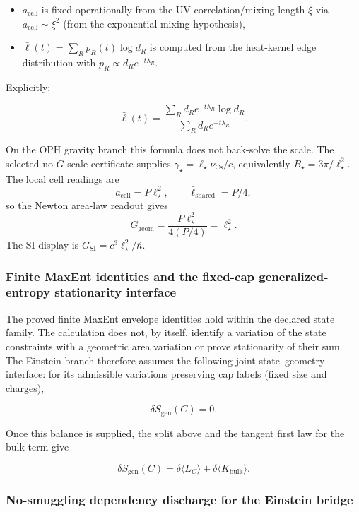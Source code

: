 \begin{itemize}
\tightlist
\item
  \(a_{\mathrm{cell}}\) is fixed operationally from the UV correlation/mixing length \(\xi\) via \(a_{\mathrm{cell}} \sim \xi^2\) (from the exponential mixing hypothesis),
\item
  \(\bar{\ell}(t) = \sum_R p_R(t) \log d_R\) is computed from the heat-kernel edge distribution with \(p_R \propto d_R e^{-t\lambda_R}\).
\end{itemize}

Explicitly:

\[
\bar{\ell}(t) = \frac{\sum_R d_R e^{-t\lambda_R} \log d_R}{\sum_R d_R e^{-t\lambda_R}}.
\]

On the OPH gravity branch this formula does not back-solve the scale. The selected
no-\(G\) scale certificate supplies
\(\gamma_\star=\ell_\star\nu_{\mathrm{Cs}}/c\), equivalently
\(B_\star=3\pi/\ell_\star^2\). The local cell readings are
\[
a_{\mathrm{cell}}=P\ell_\star^2,
\qquad
\bar{\ell}_{\mathrm{shared}}=P/4,
\]
so the Newton area-law readout gives
\[
G_{\mathrm{geom}}
=
\frac{P\ell_\star^2}{4(P/4)}
=
\ell_\star^2.
\]
The SI display is \(G_{\mathrm{SI}}=c^3\ell_\star^2/\hbar\).

\subsubsection{Finite MaxEnt identities and the fixed-cap generalized-entropy stationarity interface}\label{55-entanglement-equilibrium-from-maxent}

The proved finite MaxEnt envelope identities hold within the declared state
family. The calculation does not, by itself, identify
a variation of the state constraints with a geometric area variation or prove
stationarity of their sum.  The Einstein branch therefore assumes the
following joint state--geometry interface: for its admissible variations
preserving cap labels (fixed size and charges),

\[
\delta S_{\mathrm{gen}}(C) = 0.
\]

Once this balance is supplied, the split above and the tangent first law
for the bulk term give

\[
\delta S_{\mathrm{gen}}(C) = \delta \langle L_C \rangle + \delta \langle K_{\mathrm{bulk}} \rangle.
\]

\subsubsection{No-smuggling dependency discharge for the Einstein bridge}\label{56a-no-smuggling-dependency-discharge-for-the-einstein-bridge}

